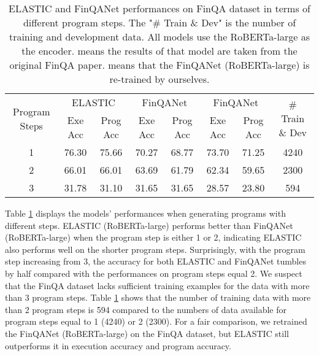 \documentclass{article}
\begin{document}
\begin{table}[tbhp!]
\caption{ELASTIC and FinQANet performances on FinQA dataset in terms of different program steps. The "\# Train \& Dev" is the number of training and development data.  All models use the RoBERTa-large as the encoder. 
 means the results of that model are taken from the original FinQA \cite{finqa} paper. 
 means that the FinQANet (RoBERTa-large) is re-trained by ourselves.\\}
\label{tab:ProgramSteps_FinQA}
\centering
\begin{small}
\begin{tabular}{@{}cccccccc@{}}
\toprule
\multirow{2}{*}{Program Steps} & \multicolumn{2}{c}{ELASTIC} & \multicolumn{2}{c}{FinQANet} & \multicolumn{2}{c}{FinQANet} & \multirow{2}{*}{\# Train \& Dev} \\ \cmidrule(lr){2-7}
  & Exe Acc & Prog Acc & Exe Acc & Prog Acc & Exe Acc & Prog Acc &      \\ \midrule
1 & 76.30   & 75.66    & 70.27   & 68.77    & 73.70   & 71.25    & 4240 \\ \midrule
2 & 66.01   & 66.01    & 63.69   & 61.79    & 62.34   & 59.65    & 2300 \\ \midrule
3 & 31.78   & 31.10    & 31.65   & 31.65    & 28.57   & 23.80    & 594  \\ \bottomrule 
\end{tabular}
\end{small}
\end{table}


Table \ref{tab:ProgramSteps_FinQA} displays the models' performances when generating programs with different steps. ELASTIC (RoBERTa-large) performs better than FinQANet (RoBERTa-large) when the program step is either 1 or 2, indicating ELASTIC also performs well on the shorter program steps. Surprisingly, with the program step increasing from 3, the accuracy for both ELASTIC and FinQANet tumbles by half compared with the performances on program steps equal 2. We suspect that the FinQA dataset lacks sufficient training examples for the data with more than 3 program steps. Table \ref{tab:ProgramSteps_FinQA} shows that the number of training data with more than 2 program steps is 594 compared to the numbers of data available for program steps equal to 1 (4240) or 2 (2300). For a fair comparison, we retrained the FinQANet (RoBERTa-large) on the FinQA dataset, but ELASTIC still outperforms it in execution accuracy and program accuracy.
\end{document}
